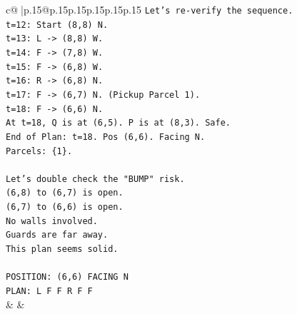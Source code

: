 \documentclass{article}
\begin{document}
{\begin{supertabular}{c@{$\;$}|p{.15\linewidth}@{}p{.15\linewidth}p{.15\linewidth}p{.15\linewidth}p{.15\linewidth}p{.15\linewidth}}
{{{\texttt{Let's re{-}verify the sequence.} \\
\texttt{t=12: Start (8,8) N.} \\
\texttt{t=13: L {-}> (8,8) W.} \\
\texttt{t=14: F {-}> (7,8) W.} \\
\texttt{t=15: F {-}> (6,8) W.} \\
\texttt{t=16: R {-}> (6,8) N.} \\
\texttt{t=17: F {-}> (6,7) N. (Pickup Parcel 1).} \\
\texttt{t=18: F {-}> (6,6) N.} \\
\texttt{At t=18, Q is at (6,5). P is at (8,3). Safe.} \\
\texttt{End of Plan: t=18. Pos (6,6). Facing N.} \\
\texttt{Parcels: \{1\}.} \\
\\ 
\texttt{Let's double check the "BUMP" risk.} \\
\texttt{(6,8) to (6,7) is open.} \\
\texttt{(6,7) to (6,6) is open.} \\
\texttt{No walls involved.} \\
\texttt{Guards are far away.} \\
\texttt{This plan seems solid.} \\
\\ 
\texttt{POSITION: (6,6) FACING N} \\
\texttt{PLAN: L F F R F F} \\
            }
        }
    }
    & & \\ \\


\end{supertabular}}
\end{document}
